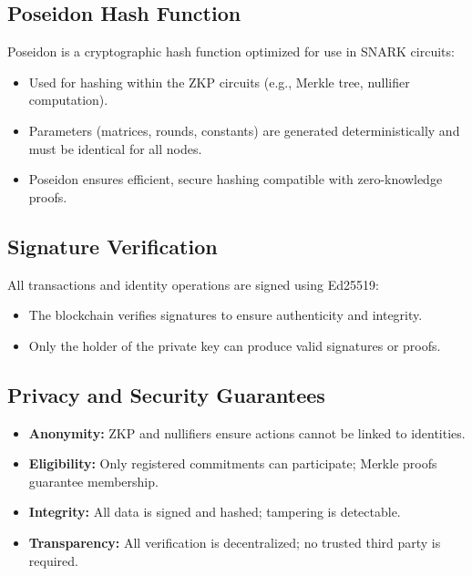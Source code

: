 \documentclass[12pt,a4paper]{report}
\begin{document}
\subsection{Poseidon Hash Function}
Poseidon is a cryptographic hash function optimized for use in SNARK circuits:
\begin{itemize}
  \item Used for hashing within the ZKP circuits (e.g., Merkle tree, nullifier computation).
  \item Parameters (matrices, rounds, constants) are generated deterministically and must be identical for all nodes.
  \item Poseidon ensures efficient, secure hashing compatible with zero-knowledge proofs.
\end{itemize}

\subsection{Signature Verification}
All transactions and identity operations are signed using Ed25519:
\begin{itemize}
  \item The blockchain verifies signatures to ensure authenticity and integrity.
  \item Only the holder of the private key can produce valid signatures or proofs.
\end{itemize}

\subsection{Privacy and Security Guarantees}
\begin{itemize}
  \item \textbf{Anonymity:} ZKP and nullifiers ensure actions cannot be linked to identities.
  \item \textbf{Eligibility:} Only registered commitments can participate; Merkle proofs guarantee membership.
  \item \textbf{Integrity:} All data is signed and hashed; tampering is detectable.
  \item \textbf{Transparency:} All verification is decentralized; no trusted third party is required.
\end{itemize}
\end{document}
